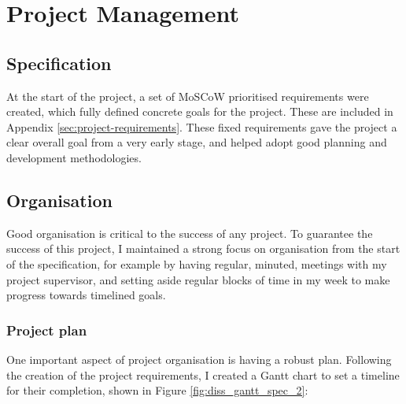 \chapter{Project Management}
\label{ch:project-management}

\section{Specification}
\label{sec:specification}

At the start of the project, a set of MoSCoW prioritised \cite{CaseMethodFastTrack} requirements were created, which fully defined concrete goals for the project. These are included in Appendix \ref{sec:project-requirements}. These fixed requirements gave the project a clear overall goal from a very early stage, and helped adopt good planning and development methodologies. 

\section{Organisation}
\label{sec:organisation}

Good organisation is critical to the success of any project. To guarantee the success of this project, I maintained a strong focus on organisation from the start of the specification, for example by having regular, minuted, meetings with my project supervisor, and setting aside regular blocks of time in my week to make progress towards timelined goals.

\subsection{Project plan}
\label{ssec:organisation-plan}

One important aspect of project organisation is having a robust plan. Following the creation of the project requirements, I created a Gantt chart to set a timeline for their completion, shown in Figure \ref{fig:diss_gantt_spec_2}:

